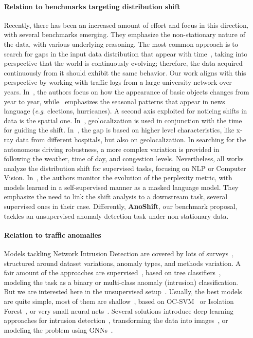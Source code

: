 \documentclass{article}
\newcommand{\eg}{\textit{e}.\textit{g}. }
\begin{document}
\paragraph{Relation to benchmarks targeting distribution shift} Recently, there has been an increased amount of effort and focus in this direction, with several benchmarks emerging. They emphasize the non-stationary nature of the data, with various underlying reasoning. The most common approach is to search for gaps in the input data distribution that appear with time~\cite{clear, mind_the_gap}, taking into perspective that the world is continuously evolving; therefore, the data acquired continuously from it should exhibit the same behavior. Our work aligns with this perspective by working with traffic logs from a large university network over  years. In~\cite{clear}, the authors focus on how the appearance of basic objects changes from year to year, while~\cite{mind_the_gap} emphasizes the seasonal patterns that appear in news language (\eg elections, hurricanes). A second axis exploited for noticing shifts in data is the spatial one. In~\cite{intel_cl_benck}, geolocalization is used in conjunction with the time for guiding the shift. In~\cite{wilds}, the gap is based on higher level characteristics, like x-ray data from different hospitals, but also on geolocalization. In searching for the autonomous driving robustness, a more complex variation is provided in ~\cite{shift_auto_drive} following the weather, time of day, and congestion levels. Nevertheless, all works analyze the distribution shift for supervised tasks, focusing on NLP or Computer Vision. In~\cite{mind_the_gap}, the authors monitor the evolution of the perplexity metric, with models learned in a self-supervised manner as a masked language model. They emphasize the need to link the shift analysis to a downstream task, several supervised ones in their case. Differently, \textbf{AnoShift}, our benchmark proposal, tackles an unsupervised anomaly detection task under non-stationary data.

\paragraph{Relation to traffic anomalies} Models tackling Network Intrusion Detection are covered by lots of surveys~\cite{nids-survey, nids_survey_3, nids_survey_4}, structured around dataset variations, anomaly types, and methods variation. A fair amount of the approaches are supervised~\cite{compare_nids}, based on tree classifiers~\cite{tree}, modeling the task as a binary or multi-class anomaly (intrusion) classification. But we are interested here in the unsupervised setup~\cite{ensemble_autoenc_nids}. Usually, the best models are quite simple, most of them are shallow~\cite{shallow_deep_nids}, based on OC-SVM~\cite{ocsvm} or Isolation Forest~\cite{isoforest}, or very small neural nets~\cite{ensemble_autoenc_nids}. Several solutions introduce deep learning approaches for intrusion detection~\cite{ DL_anom_survey}, transforming the data into images~\cite{nids_images_svm}, or modeling the problem using GNNs~\cite{gnn_nids}. 
\end{document}
